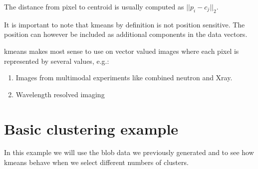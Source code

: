 \documentclass[letterpaper,10pt,english]{sphinxmanual}
\begin{document}
The distance from pixel  to centroid  is usually computed as \(||p_i - c_j||_2\).

It is important to note that k\sphinxhyphen{}means by definition is not position sensitive. The position can however be included as additional components in the data vectors.

k\sphinxhyphen{}means makes most sense to use on vector valued images where each pixel is represented by several values, e.g.:
\begin{enumerate}
%
\item {} 
Images from multimodal experiments like combined neutron and X\sphinxhyphen{}ray.

\item {} 
Wavelength resolved imaging

\end{enumerate}


\section{Basic clustering example}
\label{\detokenize{ML4NeutronImageSegmentation:basic-clustering-example}}
In this example we will use the blob data we previously generated and to see how k\sphinxhyphen{}means behave when we select different numbers of clusters.

\begin{sphinxVerbatim}[commandchars=\\\{\}]
   

    
          
    \PYG{p}{[}\PYG{p}{]}  
    \PYG{p}{[}\PYG{p}{]}
\end{sphinxVerbatim}
\end{document}
